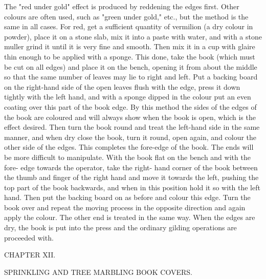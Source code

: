 \documentclass[twoside]{book}
\begin{document}
The "red under gold" effect is produced by
reddening the edges first. Other colours are often
used, such as "green under gold," etc., but the
method is the same in all cases. For red, get a
sufficient quantity of vermilion (a dry colour in
powder), place it on a stone slab, mix it into a
paste with water, and with a stone muller grind
it until it is very fine and smooth. Then mix it in
a cup with glaire thin enough to be applied with a
sponge. This done, take the book (which must be
cut on all edges) and place it on the bench,
opening it from about the middle so that the same
number of leaves may lie to right and left. Put a
backing board on the right-hand side of the open
leaves flush with the edge, press it down tightly
with the left hand, and with a sponge dipped in
the colour put an even coating over this part of
the book edge. By this method the sides of the
edges of the book are coloured and will always
show when the book is open, which is the effect
desired. Then turn the book round and treat the
left-hand side in the same manner, and when dry
close the book, turn it round, open again, and
colour the other side of the edges. This completes
the fore-edge of the book. The ends will be more
difficult to manipulate. With the book flat on the
bench and with the fore- edge towards the operator,
take the right- hand corner of the book between the
thumb and finger of the right hand and move it
towards the left, pushing the top part of the book
backwards, and when in this position hold it so
with the left hand. Then put the backing board
on as before and colour this edge. Turn the book
\pagebreak
over and repeat the moving process in the opposite
direction and again apply the colour. The
other end is treated in the same way. When
the edges are dry, the book is put into the press
and the ordinary gilding operations are proceeded
with.

\pagebreak


\thispagestyle{empty}

\vspace*{\fill}

\begin{center}

\begin{large}CHAPTER XII.\end{large}

\begin{small}SPRINKLING AND TREE MARBLING BOOK COVERS.\end{small}

\end{center}
\end{document}
